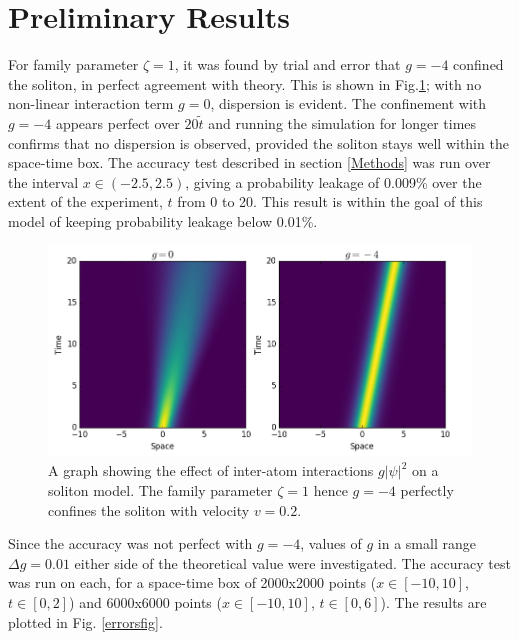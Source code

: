 \documentclass[10pt, twocolumn]{revtex4}    %
\begin{document}

\section{Preliminary Results} \label{Milestone}

 For family parameter $\zeta=1$, it was found by trial and error that $g=-4$ confined the soliton, in perfect agreement with theory. This is shown in Fig.\ref{milestone}; with no non-linear interaction term $g=0$, dispersion is evident. The confinement with $g=-4$ appears perfect over $20\tilde{t}$ and running the simulation for longer times confirms that no dispersion is observed, provided the soliton stays well within the space-time box. The accuracy test described in section \ref{Methods} was run over the interval $x \in (-2.5,2.5)$, giving a probability leakage of 0.009\% over the extent of the experiment, $t$ from 0 to 20. This result is within the goal of this model of keeping probability leakage below 0.01\%. 

\begin{figure}[h]
\includegraphics[width=\columnwidth]{milestonepic.png}
\caption{A graph showing the effect of inter-atom interactions $g |\psi|^2$ on a soliton model. The family 
parameter $\zeta = 1$ hence $g=-4$ perfectly confines the soliton with velocity $v=0.2$.}
\label{milestone}
\end{figure}

Since the accuracy was not perfect with $g=-4$, values of $g$ in a small range $\Delta g = 0.01$ either side of the theoretical value were investigated. The accuracy test was run on each, for a space-time box of 2000x2000 points ($x \in [-10,10]$, $t \in [0,2]$) and 6000x6000 points ($x \in [-10,10]$, $t \in [0,6]$). The results are plotted in Fig. \ref{errorsfig}. 
\end{document}
